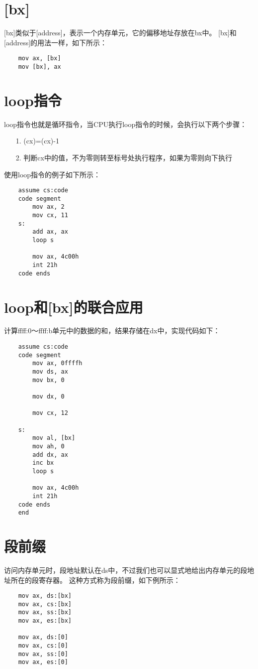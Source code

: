 \documentclass[a4paper,left=2.5cm,right=2.5cm,11pt]{article}
\begin{document}
\tableofcontents

\clearpage

\section{[bx]}
	[bx]类似于[address]，表示一个内存单元，它的偏移地址存放在bx中。
	[bx]和[address]的用法一样，如下所示：
	\begin{lstlisting}
	mov ax, [bx]
	mov [bx], ax
	\end{lstlisting}

\section{loop指令}
	loop指令也就是循环指令，当CPU执行loop指令的时候，会执行以下两个步骤：
	\begin{itemize}
		\item[1.] (cx)=(cx)-1
		\item[2.] 判断cx中的值，不为零则转至标号处执行程序，如果为零则向下执行
	\end{itemize}

	使用loop指令的例子如下所示：
	\begin{lstlisting}
	assume cs:code
	code segment
		mov ax, 2
		mov cx, 11
	s:
		add ax, ax
		loop s

		mov ax, 4c00h
		int 21h
	code ends
	\end{lstlisting}

\section{loop和[bx]的联合应用}
	计算ffff:0～ffff:b单元中的数据的和，结果存储在dx中，实现代码如下：
	\begin{lstlisting}
	assume cs:code
	code segment
		mov ax, 0ffffh
		mov ds, ax
		mov bx, 0

		mov dx, 0

		mov cx, 12

	s:
		mov al, [bx]
		mov ah, 0
		add dx, ax
		inc bx
		loop s

		mov ax, 4c00h
		int 21h
	code ends
	end
	\end{lstlisting}

\section{段前缀}
	访问内存单元时，段地址默认在ds中，不过我们也可以显式地给出内存单元的段地址所在的段寄存器。
	这种方式称为段前缀，如下例所示：
	\begin{lstlisting}
	mov ax, ds:[bx]
	mov ax, cs:[bx]
	mov ax, ss:[bx]
	mov ax, es:[bx]

	mov ax, ds:[0]
	mov ax, cs:[0]
	mov ax, ss:[0]
	mov ax, es:[0]
	\end{lstlisting}
\end{document}
